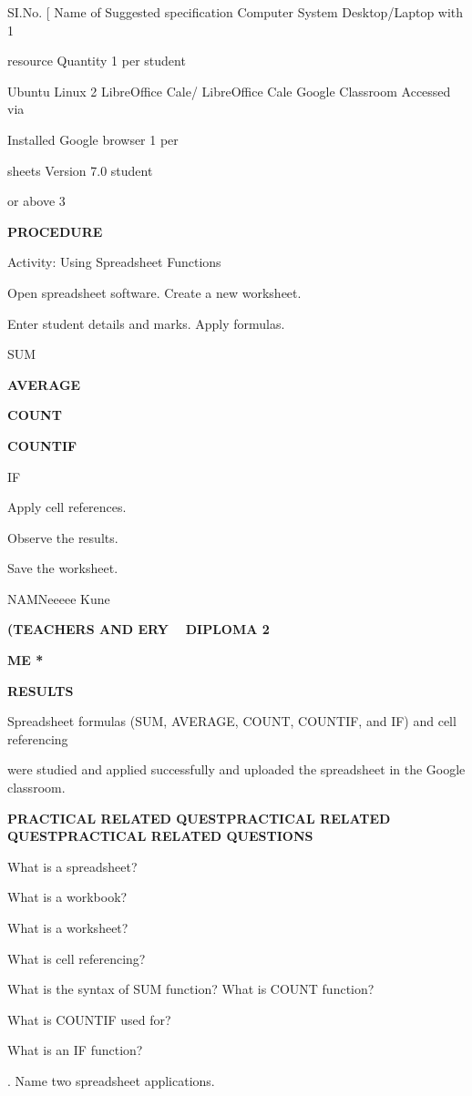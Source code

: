 \documentclass[10pt,a4paper]{article}
\begin{document}
\noindent SI.No. [ Name of            Suggested specification   Computer System          Desktop/Laptop with 1\par
\noindent resource                    Quantity 1                                         per student\par

\noindent Ubuntu Linux 2        LibreOffice Cale/     LibreOffice Cale     Google Classroom   Accessed via\par
\noindent Installed Google                        browser 1 per\par
\noindent sheets Version 7.0                      student\par
\noindent or above 3\par

\medskip\noindent\textbf{PROCEDURE}\par
\noindent Activity: Using Spreadsheet Functions\par
\noindent Open spreadsheet software. Create a new worksheet.\par
\noindent Enter student details and marks. Apply formulas.\par
\noindent SUM\par
\medskip\noindent\textbf{AVERAGE}\par
\medskip\noindent\textbf{COUNT}\par
\medskip\noindent\textbf{COUNTIF}\par
\noindent IF\par
\noindent Apply cell references.\par
\noindent Observe the results.\par
\noindent Save the worksheet.\par
\noindent NAMNeeeee Kune\par
\medskip\noindent\textbf{(TEACHERS AND ERY ~ DIPLOMA 2}\par
\medskip\noindent\textbf{ME *}\par

\medskip\noindent\textbf{RESULTS}\par
\noindent Spreadsheet formulas (SUM, AVERAGE, COUNT, COUNTIF, and IF) and cell referencing\par
\noindent were studied and applied successfully and uploaded the spreadsheet in the Google classroom.\par
\medskip\noindent\textbf{PRACTICAL RELATED QUESTPRACTICAL RELATED QUESTPRACTICAL RELATED QUESTIONS}\par
\noindent What is a spreadsheet?\par
\clearpage
\noindent What is a workbook?\par
\noindent What is a worksheet?\par
\noindent What is cell referencing?\par
\noindent What is the syntax of SUM function? What is COUNT function?\par
\noindent What is COUNTIF used for?\par
\noindent What is an IF function?\par
{}. Name two spreadsheet applications.\par
\end{document}
